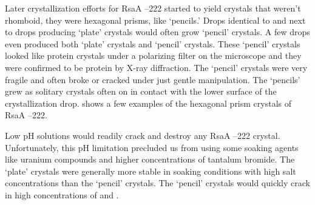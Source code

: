 Later crystallization efforts for RsaA --222 started to yield crystals that weren't rhomboid, they were hexagonal prisms, like `pencils.' Drops identical to and next to drops producing `plate' crystals would often grow `pencil' crystals. A few drops even produced both `plate' crystals and `pencil' crystals. These `pencil' crystals looked like protein crystals under a polarizing filter on the microscope and they were confirmed to be protein by X-ray diffraction. The `pencil' crystals were very fragile and often broke or cracked under just gentle manipulation. The `pencils' grew as solitary crystals often on in contact with the lower surface of the crystallization drop.  shows a few examples of the hexagonal prism crystals of RsaA --222.

Low pH solutions would readily crack and destroy any RsaA --222 crystal. Unfortunately, this pH limitation precluded us from using some soaking agents like uranium compounds and higher concentrations of tantalum bromide. The `plate' crystals were generally more stable in soaking conditions with high salt concentrations than the `pencil' crystals. The `pencil' crystals would quickly crack in high concentrations of  and .

